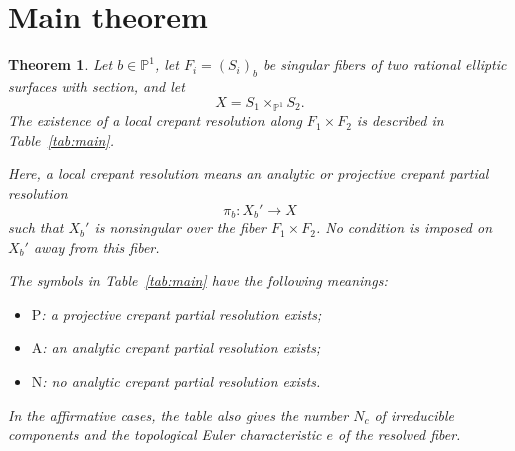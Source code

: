 \documentclass[a4paper]{amsart}
\theoremstyle{plain}
\newtheorem{Thm}{Theorem}[section]
\newtheorem{Cor}[Thm]{Corollary}
\theoremstyle{definition}
\theoremstyle{remark}
\numberwithin{equation}{section}
\newcommand{\PP}{\mathbb{P}}
\begin{document}
\medskip
\section{Main theorem}

%
\begin{Thm}\label{thm:main}
	Let $b\in\PP^{1}$, let $F_i=(S_i)_b$ be singular fibers of two
	rational elliptic surfaces with section, and let
	\[
	X=S_1\times_{\PP^1}S_2.
	\]
	The existence of a local crepant resolution along
	$F_1\times F_2$ is described in Table~\ref{tab:main}.

	Here, a local crepant resolution means an analytic or projective
	crepant partial resolution
	\[
	\pi_b\colon X_b'\longrightarrow X
	\]
	such that $X_b'$ is nonsingular over the fiber $F_1\times F_2$.
	No condition is imposed on $X_b'$ away from this fiber.

	The symbols in Table~\ref{tab:main} have the following meanings:
	\begin{itemize}
		\item $\mathrm{P}$: a projective crepant partial resolution exists;
		\item $\mathrm{A}$: an analytic crepant partial resolution exists;
		\item $\mathrm{N}$: no analytic crepant partial resolution exists.
	\end{itemize}
	In the affirmative cases, the table also gives the number $N_c$
	of irreducible components and the topological Euler characteristic
	$e$ of the resolved fiber.
\end{Thm}
\end{document}
